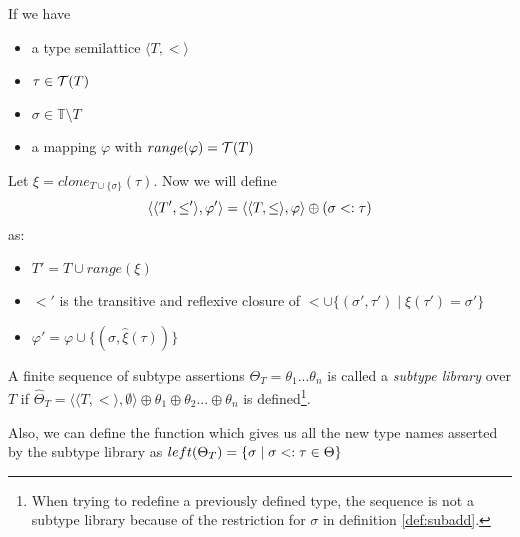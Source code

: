 \documentclass[main.tex]{subfiles}
\begin{document}

\begin{defn}
    \label{def:subadd}
    If we have
    \begin{itemize}
        \item a type semilattice $\langle T, \less \rangle$
        \item $\tau \in \mathcal{T}( T )$
        \item $\sigma \in \mathbb{T} \setminus T$
        \item a mapping $\varphi$ with $range(\varphi) = \mathcal{T}( T )$
    \end{itemize}
    Let $\xi = clone_{T \cup \{ \sigma \}}(\tau)$.
    Now we will define \[ \langle \langle T', \leq' \rangle, \varphi' \rangle
        = \langle \langle T, \leq \rangle, \varphi \rangle
        \oplus (\sigma <: \tau) \] as:
    \begin{itemize}
        \item $T' = T \cup range(\xi)$
        \item $\less'$ is the transitive and reflexive closure of
            $\less \cup \{ (\sigma', \tau') \mid \xi(\tau') = \sigma' \}$
        \item $\varphi' = \varphi \cup \{ (\sigma, \hat{\xi}(\tau)) \}$
    \end{itemize}
\end{defn}

\begin{defn}
    A finite sequence of subtype assertions
    $\Theta_T = \theta_1 ... \theta_n$ is called a \emph{subtype library} over $T$
    if $\hat{\Theta}_T = \langle \langle T, \less \rangle, \emptyset \rangle \oplus \theta_1 \oplus \theta_2 ... \oplus \theta_n$
    is defined\footnote{
        When trying to redefine a previously defined type, the sequence is not
        a subtype library because of the restriction for $\sigma$
        in definition \ref{def:subadd}.
    }.

    Also, we can define the function which gives us all the new type names
    asserted by the subtype library as
    $left(\Theta_T) = \{ \sigma \mid \sigma <: \tau \in \Theta \}$
\end{defn}
\end{document}
